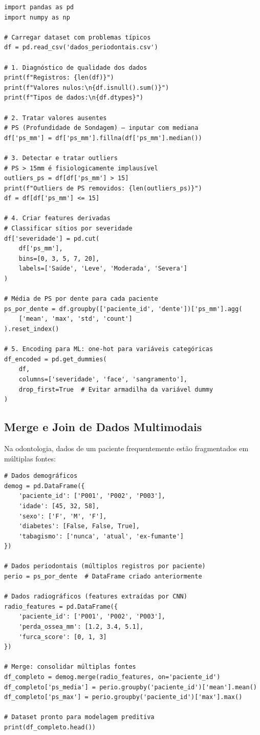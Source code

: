 \begin{verbatim}
import pandas as pd
import numpy as np

# Carregar dataset com problemas típicos
df = pd.read_csv('dados_periodontais.csv')

# 1. Diagnóstico de qualidade dos dados
print(f"Registros: {len(df)}")
print(f"Valores nulos:\n{df.isnull().sum()}")
print(f"Tipos de dados:\n{df.dtypes}")

# 2. Tratar valores ausentes
# PS (Profundidade de Sondagem) — inputar com mediana
df['ps_mm'] = df['ps_mm'].fillna(df['ps_mm'].median())

# 3. Detectar e tratar outliers
# PS > 15mm é fisiologicamente implausível
outliers_ps = df[df['ps_mm'] > 15]
print(f"Outliers de PS removidos: {len(outliers_ps)}")
df = df[df['ps_mm'] <= 15]

# 4. Criar features derivadas
# Classificar sítios por severidade
df['severidade'] = pd.cut(
    df['ps_mm'],
    bins=[0, 3, 5, 7, 20],
    labels=['Saúde', 'Leve', 'Moderada', 'Severa']
)

# Média de PS por dente para cada paciente
ps_por_dente = df.groupby(['paciente_id', 'dente'])['ps_mm'].agg(
    ['mean', 'max', 'std', 'count']
).reset_index()

# 5. Encoding para ML: one-hot para variáveis categóricas
df_encoded = pd.get_dummies(
    df,
    columns=['severidade', 'face', 'sangramento'],
    drop_first=True  # Evitar armadilha da variável dummy
)
\end{verbatim}

\subsection{Merge e Join de Dados Multimodais}

Na odontologia, dados de um paciente frequentemente estão fragmentados em múltiplas fontes:

\begin{verbatim}
# Dados demográficos
demog = pd.DataFrame({
    'paciente_id': ['P001', 'P002', 'P003'],
    'idade': [45, 32, 58],
    'sexo': ['F', 'M', 'F'],
    'diabetes': [False, False, True],
    'tabagismo': ['nunca', 'atual', 'ex-fumante']
})

# Dados periodontais (múltiplos registros por paciente)
perio = ps_por_dente  # DataFrame criado anteriormente

# Dados radiográficos (features extraídas por CNN)
radio_features = pd.DataFrame({
    'paciente_id': ['P001', 'P002', 'P003'],
    'perda_ossea_mm': [1.2, 3.4, 5.1],
    'furca_score': [0, 1, 3]
})

# Merge: consolidar múltiplas fontes
df_completo = demog.merge(radio_features, on='paciente_id')
df_completo['ps_media'] = perio.groupby('paciente_id')['mean'].mean()
df_completo['ps_max'] = perio.groupby('paciente_id')['max'].max()

# Dataset pronto para modelagem preditiva
print(df_completo.head())
\end{verbatim}


